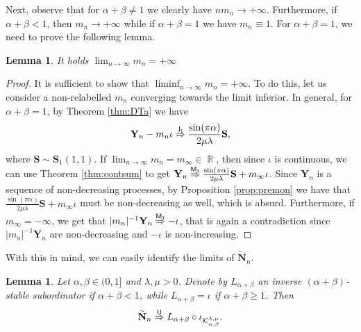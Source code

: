 \documentclass[]{amsart}
\numberwithin{equation}{section}
\newtheorem{lem}[thm]{Lemma}
\theoremstyle{remark}
\theoremstyle{definition}
\DeclareMathOperator{\R}{\mathbb{R}}
\begin{document}
Next, observe that for $\alpha+\beta \not = 1$ we clearly have $nm_n \to +\infty$. Furthermore, if $\alpha+\beta<1$, then $m_n \to +\infty$ while if $\alpha+\beta=1$ we have $m_n \equiv 1$. For $\alpha+\beta=1$, we need to prove the following lemma.
\begin{lem}
	It holds $\lim_{n \to \infty}m_n=+\infty$
\end{lem}
\begin{proof}
	It is sufficient to show that $\liminf_{n \to \infty}m_n=+\infty$. To do this, let us consider a non-relabelled $m_n$ converging towards the limit inferior. In general, for $\alpha+\beta=1$, by Theorem \ref{thm:DTa} we have
	\begin{equation}\label{eq:Stable1}
		\mathbf{Y}_n-m_n \iota \overset{\sf J_1}{\Rightarrow}\frac{\sin(\pi \alpha)}{2\mu \lambda}\mathbf{S},
	\end{equation}
	where $\mathbf{S} \sim \mathbf{S}_1(1,1)$. If $\lim_{n \to \infty}m_n=m_\infty \in \R$, then since $\iota$ is continuous, we can use Theorem \ref{thm:contsum} to get $\mathbf{Y}_n \overset{\sf M_1}{\Rightarrow}  \frac{\sin(\pi \alpha)}{2\mu \lambda}\mathbf{S}+m_\infty\iota$. Since $\mathbf{Y}_n$ is a sequence of non-decreasing processes, by Proposition \ref{prop:premon} we have that $\frac{\sin(\pi \alpha)}{2\mu \lambda}\mathbf{S}+m_\infty\iota$ must be non-decreasing as well, which is absurd. Furthermore, if $m_\infty=-\infty$, we get that $|m_n|^{-1}\mathbf{Y}_n\overset{\sf M_1}{\Rightarrow}-\iota$, that is again a contradiction since $|m_n|^{-1}\mathbf{Y}_n$ are non-decreasing and $-\iota$ is non-increasing.
\end{proof}
With this in mind, we can easily identify the limits of $\widetilde{\mathbf{N}}_n$.
\begin{lem}\label{prop:tildeN}
	Let $\alpha,\beta \in (0,1]$ and $\lambda,\mu>0$. Denote by $L_{\alpha+\beta}$ an inverse $(\alpha+\beta)$-stable subordinator if $\alpha+\beta<1$, while $L_{\alpha+\beta}=\iota$ if $\alpha+\beta \ge 1$. Then
	\begin{equation}\label{eq:limittildeN}
		\widetilde{\mathbf{N}}_n\overset{\sf U}{\Rightarrow} L_{\alpha+\beta} \circ \iota_{\mathcal{K}_{\alpha,\beta}^{\lambda,\mu}}.
	\end{equation}
\end{lem}
\end{document}
